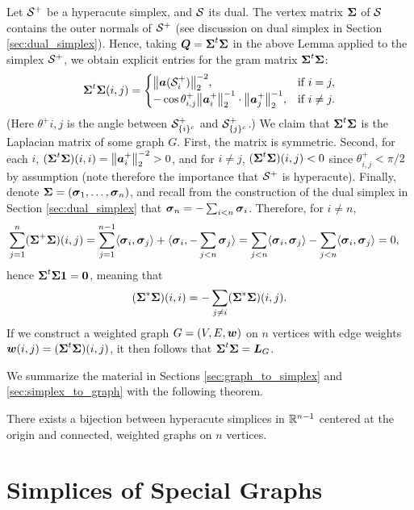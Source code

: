 Let $\mathcal{S}^+$ be a hyperacute simplex, and $\mathcal{S}$ its dual. The vertex matrix $\boldsymbol{\Sigma}$ of $\mathcal{S}$ contains the outer normals of $\mathcal{S}^+$ (see discussion on dual simplex in Section \ref{sec:dual_simplex}). Hence, taking $\vb*{Q}=\boldsymbol{\Sigma}^t \boldsymbol{\Sigma}$ in the above Lemma applied to the simplex $\mathcal{S}^+$, we obtain explicit entries for the gram matrix $\boldsymbol{\Sigma}^t\boldsymbol{\Sigma}$: 
\begin{equation*}
    \boldsymbol{\Sigma}^t \boldsymbol{\Sigma}(i,j) = \begin{cases}
    \norm{\vb*{a}(\mathcal{S}_i^+)}_2^{-2},& \text{if }i=j,\\
-\cos\theta^+_{i,j} \norm{\vb*{a}_i^+}_2^{-1}\cdot \norm{\vb*{a}_j^+}_2^{-1},& \text{if }i\neq j.
    \end{cases}
\end{equation*}
(Here $\theta^+{i,j}$ is the angle between $\mathcal{S}_{\{i\}^c}^+$ and $\mathcal{S}_{\{j\}^c}^+$.)
We claim that $\boldsymbol{\Sigma}^t\boldsymbol{\Sigma}$ is the Laplacian matrix of some graph $G$. First, the matrix is symmetric. Second,
for each $i$, $(\boldsymbol{\Sigma}^t\boldsymbol{\Sigma})(i,i)=\norm{\vb*{a}_i^+}_2^{-2}>0$, and for $i\neq j$, $(\boldsymbol{\Sigma}^t\boldsymbol{\Sigma})(i,j) <0$ since $\theta^+_{i,j}<\pi/2$ by assumption (note therefore the importance that $\mathcal{S}^+$ is hyperacute). Finally, denote $\boldsymbol{\Sigma}=(\vb*{\sigma}_1,\dots,\vb*{\sigma}_n)$, and recall from the construction of the dual simplex in Section \ref{sec:dual_simplex} that $\vb*{\sigma}_n=-\sum_{i<n}\vb*{\sigma}_i$. Therefore, for $i\neq n$, 
\begin{align*}
    \sum_{j=1}^n (\boldsymbol{\Sigma}^+\boldsymbol{\Sigma})(i,j) &= \sum_{j=1}^{n-1} \langle \vb*{\sigma}_i,\vb*{\sigma}_j\rangle + \langle \vb*{\sigma}_i,-\sum_{j<n}\vb*{\sigma}_j\rangle = \sum_{j<n}\langle \vb*{\sigma}_i,\vb*{\sigma}_j\rangle - \sum_{j<n}\langle \vb*{\sigma}_i,\vb*{\sigma}_j\rangle  = 0,
\end{align*}
hence $\boldsymbol{\Sigma}^t\boldsymbol{\Sigma}\vb{1}=\vb{0}$, meaning that 
\[(\boldsymbol{\Sigma}^*\boldsymbol{\Sigma})(i,i) = -\sum_{j\neq i}(\boldsymbol{\Sigma}^*\boldsymbol{\Sigma})(i,j).\]
If we construct a weighted graph $G=(V,E,\vb*{w})$ on $n$ vertices with edge weights $\vb*{w}(i,j) = (\boldsymbol{\Sigma}^t\boldsymbol{\Sigma})(i,j)$, it then follows that $\boldsymbol{\Sigma}^t\boldsymbol{\Sigma}=\vb*{L}_G$. 

We summarize the material in Sections \ref{sec:graph_to_simplex} and \ref{sec:simplex_to_graph} with the following theorem. 

\begin{theorem}
	There exists a bijection between hyperacute simplices in $\mathbb{R}^{n-1}$ centered at the origin and connected, weighted graphs on $n$ vertices. 
\end{theorem}

\section{Simplices of Special Graphs}


